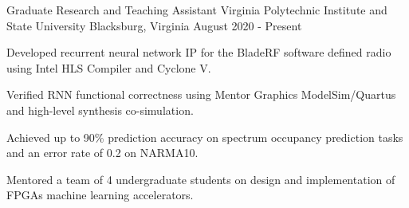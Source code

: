 


\begin{cventries}



\cventry
{Graduate Research and Teaching Assistant} %
{Virginia Polytechnic Institute and State University} %
{Blacksburg, Virginia} %
{August 2020 - Present} %
{ %
\begin{cvitems}
\item {Developed recurrent neural network IP for the BladeRF software defined radio using Intel HLS Compiler and Cyclone V.}
\item {Verified RNN functional correctness using Mentor Graphics ModelSim/Quartus and high-level synthesis co-simulation.}
\item {Achieved up to 90\% prediction accuracy on spectrum occupancy prediction tasks and an error rate of 0.2 on NARMA10.}
\item{Mentored a team of 4 undergraduate students on design and implementation of FPGAs machine learning accelerators.}
\end{cvitems}
}




\end{cventries}
